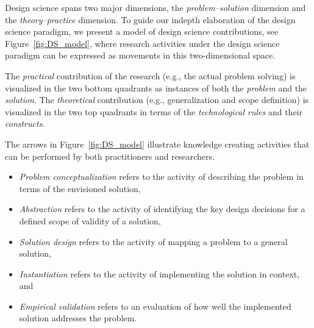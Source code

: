 \documentclass[graybox]{svmult}
\begin{document}

Design science spans two major dimensions, the \emph{problem--solution} dimension and the \emph{theory--practice} dimension. To guide our indepth elaboration of the design science paradigm, we present a model of design science contributions, see Figure~\ref{fig:DS_model}, where research activities under the design science paradigm can be expressed as movements in this two-dimensional space.

The \emph{practical} contribution of the research (e.g., the actual problem solving) is visualized in the two bottom quadrants as instances of both the \emph{problem} and the \emph{solution}. The \emph{theoretical} contribution (e.g., generalization and scope definition) is visualized in the two top quadrants in terms of the \emph{technological rules} and their \emph{constructs}. 

The arrows in Figure~\ref{fig:DS_model} illustrate knowledge creating activities that can be performed by both practitioners and researchers. 
\begin{itemize}
\item \emph{Problem conceptualization} refers to the activity of describing the problem in terms of the envisioned solution, 
\item \emph{Abstraction} refers to the activity of identifying the key design decisions for a defined scope of validity of a solution, 
\item \emph{Solution design} refers to the activity of mapping a problem to a general solution, \item \emph{Instantiation} refers to the activity of implementing the solution in context, and  \item \emph{Empirical validation} refers to an evaluation of how well the implemented solution addresses the problem.
\end{itemize}
\end{document}
